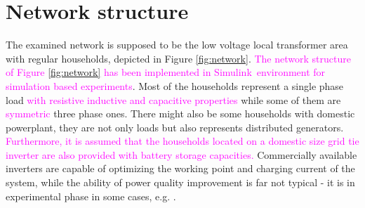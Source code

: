 
\section{Network structure}

         The examined network is supposed to be the low voltage local transformer area with regular households, depicted in Figure \ref{fig:network}. \textcolor{magenta}{The network structure of Figure \ref{fig:network} has been implemented in Simulink\texttrademark\, environment for simulation based experiments}. Most of the households represent a single phase load \textcolor{magenta}{with resistive inductive and capacitive properties} while some of them are \textcolor{magenta}{symmetric} three phase ones. There might also be some households with domestic powerplant, they are not only loads but also
         represents distributed generators. \textcolor{magenta}{Furthermore, it is assumed that the households located on a domestic size grid tie inverter are also provided with battery storage capacities.} Commercially available inverters are capable of optimizing the working point and charging current of the system, while the ability of power quality improvement is far not typical - it is in experimental phase in some cases, e.g. \cite{gorbe2012reduction}.%

